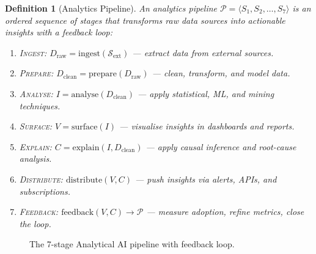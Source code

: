 \documentclass[12pt, a4paper]{article}
\newtheorem{definition}{Definition}
\begin{document}
\begin{definition}[Analytics Pipeline]
An analytics pipeline $\mathcal{P} = \langle S_1, S_2, \ldots, S_7 \rangle$ is an ordered sequence of stages that transforms raw data sources into actionable insights with a feedback loop:
\begin{enumerate}
    \item \textsc{Ingest}: $D_{\text{raw}} = \text{ingest}(\mathcal{S}_{\text{ext}})$ --- extract data from external sources.
    \item \textsc{Prepare}: $D_{\text{clean}} = \text{prepare}(D_{\text{raw}})$ --- clean, transform, and model data.
    \item \textsc{Analyse}: $I = \text{analyse}(D_{\text{clean}})$ --- apply statistical, ML, and mining techniques.
    \item \textsc{Surface}: $V = \text{surface}(I)$ --- visualise insights in dashboards and reports.
    \item \textsc{Explain}: $C = \text{explain}(I, D_{\text{clean}})$ --- apply causal inference and root-cause analysis.
    \item \textsc{Distribute}: $\text{distribute}(V, C)$ --- push insights via alerts, APIs, and subscriptions.
    \item \textsc{Feedback}: $\text{feedback}(V, C) \rightarrow \mathcal{P}$ --- measure adoption, refine metrics, close the loop.
\end{enumerate}
\end{definition}

\begin{figure}[ht]
\centering
{}
\caption{The 7-stage Analytical AI pipeline with feedback loop.}
\label{fig:pipeline}
\end{figure}
\end{document}
